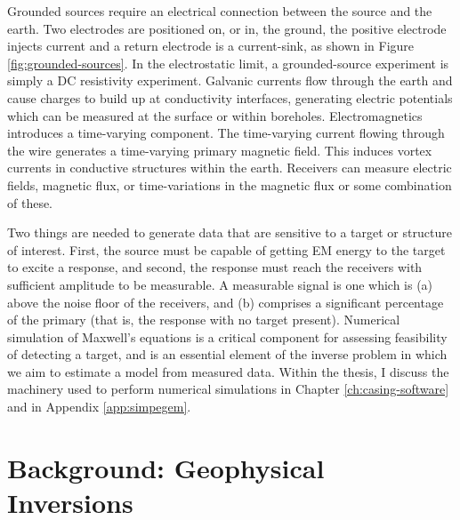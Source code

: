 Grounded sources require an electrical connection between the source and the earth. Two electrodes are positioned on, or in, the ground, the positive electrode injects current and a return electrode is a current-sink, as shown in Figure \ref{fig:grounded-sources}. In the electrostatic limit, a grounded-source experiment is simply a DC resistivity experiment. Galvanic currents flow through the earth and cause charges to build up at conductivity interfaces, generating electric potentials which can be measured at the surface or within boreholes. Electromagnetics introduces a time-varying component. The time-varying current flowing through the wire generates a time-varying primary magnetic field. This induces vortex currents in conductive structures within the earth. Receivers can measure electric fields, magnetic flux, or time-variations in the magnetic flux or some combination of these.



Two things are needed to generate data that are sensitive to a target or structure of interest. First, the source must be capable of getting EM energy to the target to excite a response, and second, the response must reach the receivers with sufficient amplitude to be measurable. A measurable signal is one which is (a) above the noise floor of the receivers, and (b) comprises a significant percentage of the primary (that is, the response with no target present). Numerical simulation of Maxwell's equations is a critical component for assessing feasibility of detecting a target, and is an essential element of the inverse problem in which we aim to estimate a model from measured data. Within the thesis, I discuss the machinery used to perform numerical simulations in Chapter \ref{ch:casing-software} and in Appendix \ref{app:simpegem}.
\section{Background: Geophysical Inversions}
\label{sec:background-inversions}


